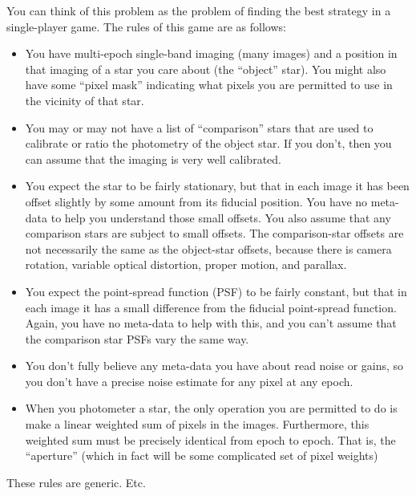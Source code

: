 \documentclass[12pt,letterpaper]{article}
\begin{document}
You can think of this problem as the problem of finding the best strategy in a single-player game.
The rules of this game are as follows:
\begin{itemize}
\item
  You have multi-epoch single-band imaging (many images)
  and a position in that imaging of a star you care about (the ``object'' star).
  You might also have some ``pixel mask'' indicating what pixels you are permitted to use
  in the vicinity of that star.
\item
  You may or may not have a list of ``comparison'' stars
  that are used to calibrate or ratio the photometry of the object star.
  If you don't, then you can assume that the imaging is very well calibrated.
\item
  You expect the star to be fairly stationary,
  but that in each image it has been offset slightly by some amount from its fiducial position.
  You have no meta-data to help you understand those small offsets.
  You also assume that any comparison stars are subject to small offsets.
  The comparison-star offsets are not necessarily the same as the object-star offsets,
  because there is camera rotation, variable optical distortion, proper motion, and parallax.
\item
  You expect the point-spread function (PSF) to be fairly constant,
  but that in each image it has a small difference from the fiducial point-spread function.
  Again, you have no meta-data to help with this,
  and you can't assume that the comparison star PSFs vary the same way.
\item
  You don't fully believe any meta-data you have about read noise or gains,
  so you don't have a precise noise estimate for any pixel at any epoch.
\item
  When you photometer a star,
  the only operation you are permitted to do is make a linear weighted sum of pixels in the images.
  Furthermore, this weighted sum must be precisely identical from epoch to epoch.
  That is, the ``aperture''
  (which in fact will be some complicated set of pixel weights)
\end{itemize}
These rules are generic.  Etc.
\end{document}
